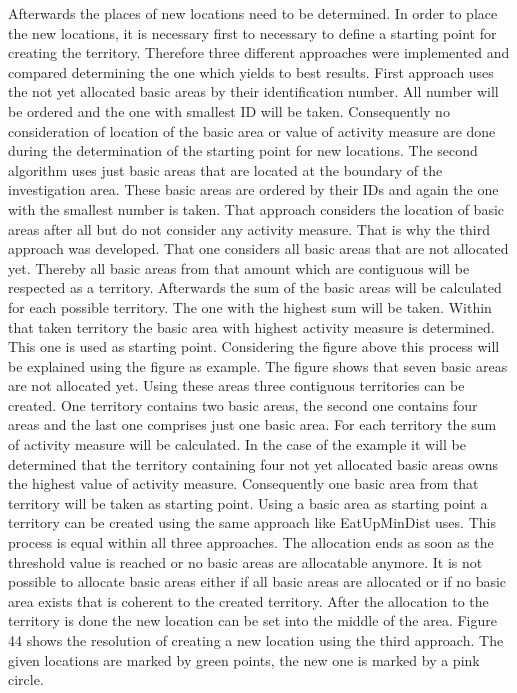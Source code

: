 Afterwards the places of new locations need to be determined. In order to place the new locations, it is necessary first to necessary to define a starting point for creating the territory. Therefore three different approaches were implemented and compared determining the one which yields to best results. First approach uses the not yet allocated basic areas by their identification number. All number will be ordered and the one with smallest ID will be taken. Consequently no consideration of location of the basic area or value of activity measure are done during the determination of the starting point for new locations. The second algorithm uses just basic areas that are located at the boundary of the investigation area. These basic areas are ordered by their IDs and again the one with the smallest number is taken. That approach considers the location of basic areas after all but do not consider any activity measure. That is why the third approach was developed. That one considers all basic areas that are not allocated yet. Thereby all basic areas from that amount which are contiguous will be respected as a territory. Afterwards the sum of the basic areas will be calculated for each possible territory. The one with the highest sum will be taken. Within that taken territory the basic area with highest activity measure is determined. This one is used as starting point. Considering the figure above this process will be explained using the figure as example. The figure shows that seven basic areas are not allocated yet. Using these areas three contiguous territories can be created. One territory contains two basic areas, the second one contains four areas and the last one comprises just one basic area. For each territory the sum of activity measure will be calculated. In the case of the example it will be determined that the territory containing four not yet allocated basic areas owns the highest value of activity measure. Consequently one basic area from that territory will be taken as starting point. Using a basic area as starting point a territory can be created using the same approach like EatUpMinDist uses. This process is equal within all three approaches. The allocation ends as soon as the threshold value is reached or no basic areas are allocatable anymore. It is not possible to allocate basic areas either if all basic areas are allocated or if no basic area exists that is coherent to the created territory. After the allocation to the territory is done the new location can be set into the middle of the area. Figure 44 shows the resolution of creating a new location using the third approach. The given locations are marked by green points, the new one is marked by a pink circle.

